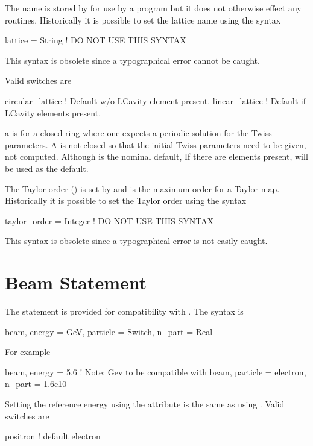 The  name is stored by \bmad for use by a program but it does
not otherwise effect any \bmad routines. 
Historically it is possible to set the lattice name using the syntax
\begin{example}
  lattice = String   ! DO NOT USE THIS SYNTAX
\end{example}
This syntax is obsolete since a typographical error cannot be caught.

\noindent
Valid  switches are
\begin{example}
  circular_lattice  ! Default w/o LCavity element present.
  linear_lattice     ! Default if LCavity elements present.
\end{example}
a  is for a closed ring where one expects a
periodic solution for the Twiss parameters. A  is
not closed so that the initial Twiss parameters need to be given, not
computed. Although  is the nominal default, If
there are  elements present,  will be used
as the default.

The Taylor order () is set by
 and is the maximum order for a Taylor map.
Historically it is possible to set the Taylor order using the syntax
\begin{example}
  taylor_order = Integer   ! DO NOT USE THIS SYNTAX
\end{example}
This syntax is obsolete since a typographical error is not easily caught.

\section{Beam Statement}

The  statement is provided for compatibility with \mad. The syntax is
\begin{example}
  beam, energy = GeV, particle = Switch, n_part = Real
\end{example}
For example
\begin{example}
  beam, energy = 5.6  ! Note: Gev to be compatible with \mad
  beam, particle = electron, n_part = 1.6e10
\end{example}
Setting the reference energy using the  attribute is the same
as using . Valid 
switches are
\begin{example}
  positron  ! default
  electron
\end{example}

